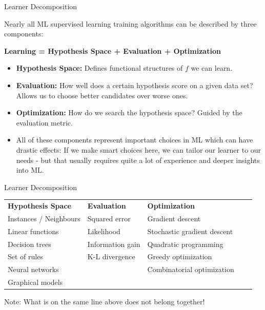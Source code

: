 \begin{frame}{Learner Decomposition}

Nearly all ML supervised learning training algorithms can be described
by three components:

\begin{center}
  \textbf{Learning = Hypothesis Space + Evaluation + Optimization}
\end{center}

\begin{itemize}
\item
  \textbf{Hypothesis Space:} Defines functional
  structures of \(f\) we can learn.
\item
  \textbf{Evaluation:} How well does a certain hypothesis score on a
  given data set? Allows us to choose better candidates over worse ones.
\item
  \textbf{Optimization:} How do we search the hypothesis space? Guided
  by the evaluation metric.
\item
  All of these components represent important choices in ML which can
  have drastic effects:
  \newline
  If we make smart choices here, we can tailor our learner to our needs
  - but that usually requires quite a lot of experience and deeper
  insights into ML.
\end{itemize}

\end{frame}

\begin{frame}{Learner Decomposition}

\begin{table}[]
\begin{tabular}{lllll}
  \textbf{Hypothesis Space} & \textbf{Evaluation} &  \textbf{Optimization}&  &  \\
Instances / Neighbours & Squared error & Gradient descent &  \\
Linear functions & Likelihood & Stochastic gradient descent  &  \\
Decision trees & Information gain & Quadratic programming & \\
Set of rules & K-L divergence & Greedy optimization & \\
Neural networks & & Combinatorial optimization & \\
Graphical models & & \\
\end{tabular}
\end{table}

Note: What is on the same line above does not belong together!

\end{frame}


